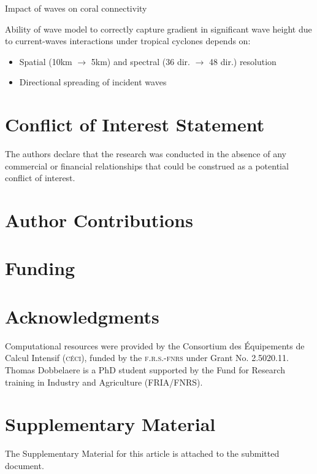 \documentclass[11pt,a4paper]{article}
\begin{document}
Impact of waves on coral connectivity

Ability of wave model to correctly capture gradient in significant wave height due to current-waves interactions under tropical cyclones depends on:
\begin{itemize}
    \item Spatial (10km $\to$ 5km) and spectral (36 dir. $\to$ 48 dir.) resolution \citep{hegermiller2019wave}
    \item Directional spreading of incident waves \citep{villas2020wave}
\end{itemize}

\section*{Conflict of Interest Statement}
The authors declare that the research was conducted in the absence of any commercial or financial relationships that could be construed as a potential conflict of interest.

\section*{Author Contributions}
  
\section*{Funding}

\section*{Acknowledgments}
Computational resources were provided by the Consortium des \'Equipements de Calcul Intensif (\textsc{c\'eci}), funded by the \textsc{f.r.s.-fnrs} under Grant No. 2.5020.11. Thomas Dobbelaere is a PhD student supported by the Fund for Research training in Industry and Agriculture (\textsc{FRIA}/\textsc{FNRS}).

\section*{Supplementary Material}
The Supplementary Material for this article is attached to the submitted document.

%  




\end{document}

